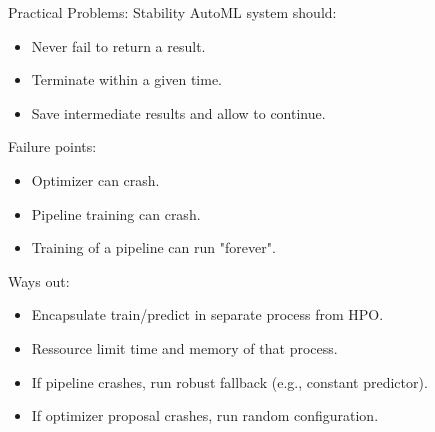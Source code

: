 	\begin{frame}{Practical Problems: Stability}
		AutoML system should: 
		\begin{itemize}
			\item Never fail to return a result.
			\item Terminate within a given time.
			\item Save intermediate results and allow to continue.
		\end{itemize}

		Failure points:
		\begin{itemize}
			\item Optimizer can crash.
			\item Pipeline training can crash.
			\item Training of a pipeline can run "forever". 
		\end{itemize}

		Ways out:
		\begin{itemize}
			\item Encapsulate train/predict in separate process from HPO.
			\item Ressource limit time and memory of that process.
			\item If pipeline crashes, run robust fallback (e.g., constant predictor).   
			\item If optimizer proposal crashes, run random configuration.
		\end{itemize}
		
	\end{frame}
	
